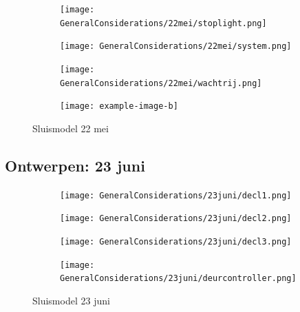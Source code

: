 \documentclass{article}
\begin{document}
	\begin{figure}
		\centering
		\begin{subfigure}{0.45\linewidth}
			\texttt{[image: GeneralConsiderations/22mei/stoplight.png]}
			\caption{}
			\label{fig:1a}
		\end{subfigure}\hfill
		\begin{subfigure}{0.45\linewidth}
			\texttt{[image: GeneralConsiderations/22mei/system.png]}
			\caption{}
			\label{fig:1a}
		\end{subfigure}
		
		\begin{subfigure}{0.45\linewidth}
			\texttt{[image: GeneralConsiderations/22mei/wachtrij.png]}
			\caption{}
			\label{fig:1a}
		\end{subfigure}\hfill
		\begin{subfigure}{0.45\linewidth}
			\texttt{[image: example-image-b]}
			\caption{}
			\label{fig:1a}
		\end{subfigure}
		\caption{Sluismodel 22 mei}
		\label{fig:1}
	\end{figure}
	
	\newpage
	\subsection{Ontwerpen: 23 juni }
	\begin{figure}
		\centering
		\begin{subfigure}{0.45\linewidth}
			\texttt{[image: GeneralConsiderations/23juni/decl1.png]}
			\caption{}
			\label{fig:1a}
		\end{subfigure}\hfill
		\begin{subfigure}{0.45\linewidth}
			\texttt{[image: GeneralConsiderations/23juni/decl2.png]}
			\caption{}
			\label{fig:1a}
		\end{subfigure}
		
		\begin{subfigure}{0.45\linewidth}
			\texttt{[image: GeneralConsiderations/23juni/decl3.png]}
			\caption{}
			\label{fig:1a}
		\end{subfigure}\hfill
		\begin{subfigure}{0.45\linewidth}
			\texttt{[image: GeneralConsiderations/23juni/deurcontroller.png]}
			\caption{}
			\label{fig:1a}
		\end{subfigure}
		\caption{Sluismodel 23 juni}
		\label{fig:1}
	\end{figure}
	
\end{document}
